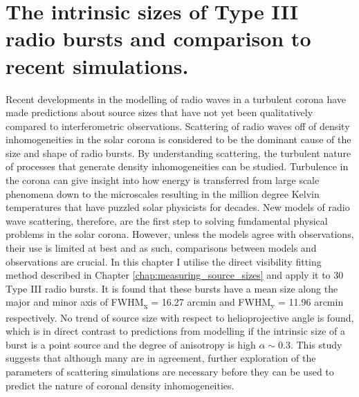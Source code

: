 \doublespacing
\chapter{The intrinsic sizes of Type III radio bursts and comparison to recent simulations.}
\label{chap:observations_vs_theory}
Recent developments in the modelling of radio waves in a turbulent corona have made predictions about source sizes that have not yet been qualitatively compared to interferometric observations. Scattering of radio waves off of density inhomogeneities in the solar corona is considered to be the dominant cause of the size and shape of radio bursts. By understanding scattering, the turbulent nature of processes that generate density inhomogeneities can be studied. Turbulence in the corona can give insight into how energy is transferred from large scale phenomena down to the microscales resulting in the million degree Kelvin temperatures that have puzzled solar physicists for decades. New models of radio wave scattering, therefore, are the first step to solving fundamental physical problems in the solar corona. However, unless the models agree with observations, their use is limited at best and as such, comparisons between models and observations are crucial. In this chapter I utilise the direct visibility fitting method described in Chapter \ref{chap:measuring_source_sizes} and apply it to 30 Type III radio bursts. It is found that these bursts have a mean size along the major and minor axis of FWHM\textsubscript{x} = 16.27 arcmin and FWHM\textsubscript{y} = 11.96 arcmin respectively. No trend of source size with respect to helioprojective angle is found, which is in direct contrast to predictions from modelling if the intrinsic size of a burst is a point source and the degree of anisotropy is high $\alpha \sim 0.3$. This study suggests that although many are in agreement, further exploration of the parameters of scattering simulations are necessary before they can be used to predict the nature of coronal density inhomogeneities.

